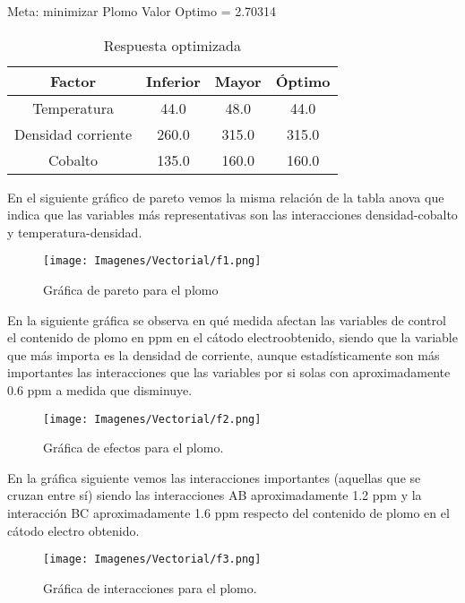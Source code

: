 Meta: minimizar Plomo \phantom{eres un pendejo} Valor Optimo = 2.70314

\begin{table}[H]
\label{tabla15}
\begin{center}
\begin{tabular}{|c|c|c|c|}
\hline
Factor&Inferior&Mayor&\'Optimo\\
\hline
Temperatura&44.0&48.0&44.0\\
\hline
Densidad corriente&260.0&315.0&315.0\\
\hline
Cobalto&135.0&160.0&160.0\\
\hline
\end{tabular}
\end{center}
\caption{Respuesta optimizada}
\end{table}

En el siguiente gr\'afico de pareto vemos la misma relaci\'on de la tabla anova que indica que las variables m\'as representativas son las interacciones densidad-cobalto y temperatura-densidad.

\begin{figure}[H]
 \centering
 \texttt{[image: Imagenes/Vectorial/f1.png]}
 \caption{Gr\'afica de pareto para el plomo}
 \label{fig:f1}
\end{figure}

En la siguiente gr\'afica se observa en qu\'e medida afectan las variables de control el contenido de plomo en ppm en el c\'atodo electroobtenido, siendo que la variable que m\'as importa es la densidad de corriente, aunque estad\'isticamente son m\'as importantes las interacciones que las variables por si solas con aproximadamente 0.6 ppm a medida que disminuye.

\begin{figure}[H]
 \centering
 \texttt{[image: Imagenes/Vectorial/f2.png]}
 \caption{Gr\'afica de efectos para el plomo.}
 \label{fig:f2}
\end{figure}

En la gr\'afica siguiente vemos las interacciones importantes (aquellas que se cruzan entre s\'i) siendo las interacciones AB aproximadamente 1.2 ppm y la interacci\'on BC aproximadamente 1.6 ppm respecto del contenido de plomo en el c\'atodo electro obtenido.

\begin{figure}[H]
 \centering
 \texttt{[image: Imagenes/Vectorial/f3.png]}
 \caption{Gr\'afica de interacciones para el plomo.}
 \label{fig:f3}
\end{figure}

